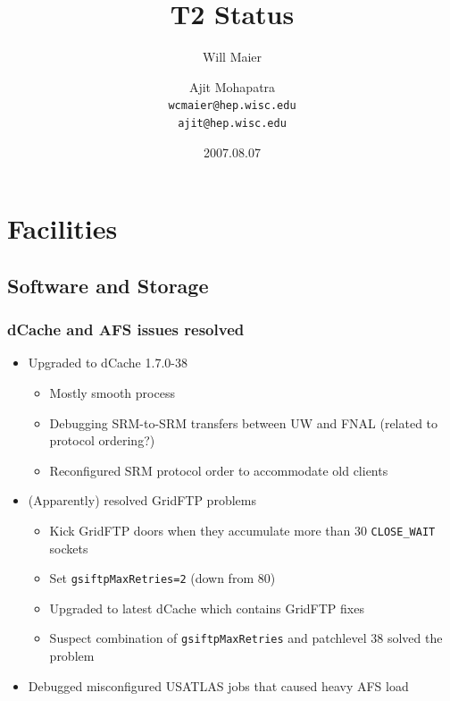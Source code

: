 \documentclass{beamer}
\title{T2 Status}
\author[Maier, Mohapatra]{
    Will Maier \and Ajit Mohapatra\\ 
    {\tt wcmaier@hep.wisc.edu}\\
    {\tt ajit@hep.wisc.edu}}
\institute[Wisconsin]{University of Wisconsin - High Energy Physics}
\date{2007.08.07}
\begin{document}
\begin{frame}
    \titlepage
\end{frame}


\section{Facilities}
\subsection{Software and Storage}
\begin{frame}
\frametitle{dCache and AFS issues resolved}

\begin{itemize}
    \item Upgraded to dCache 1.7.0-38
    \begin{itemize}
        \item Mostly smooth process
        \item Debugging SRM-to-SRM transfers between UW and FNAL (related to protocol ordering?)
        \item Reconfigured SRM protocol order to accommodate old clients
    \end{itemize}
    \item (Apparently) resolved GridFTP problems
    \begin{itemize}
        \item Kick GridFTP doors when they accumulate more than 30 {\tt CLOSE\_WAIT} sockets
        \item Set {\tt gsiftpMaxRetries=2} (down from 80)
        \item Upgraded to latest dCache which contains GridFTP fixes
        \item Suspect combination of {\tt gsiftpMaxRetries} and patchlevel 38 solved the problem
    \end{itemize}
    \item Debugged misconfigured USATLAS jobs that caused heavy AFS load
\end{itemize}
\end{frame}
\end{document}
